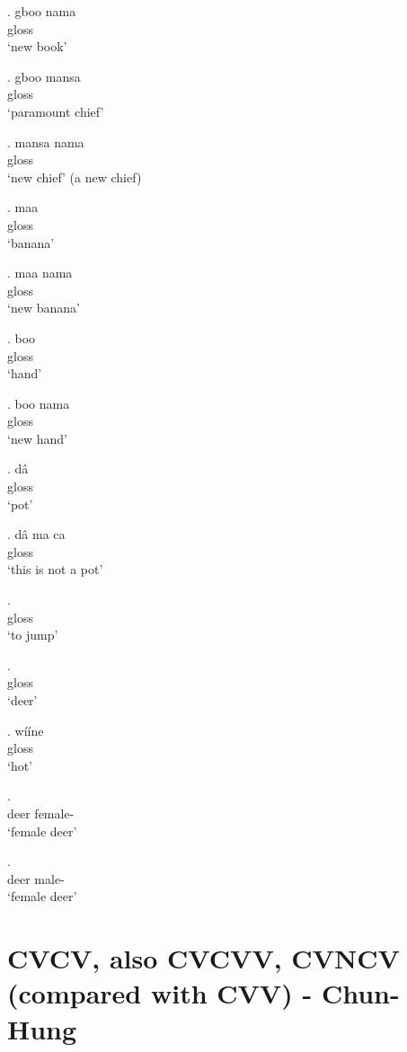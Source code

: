 \documentclass{assets/fieldnotes}
\begin{document}
\exg. gboo nama \\
gloss \\
`new book'

\exg. gboo mansa \\ %
gloss \\
`paramount chief'

\exg. mansa nama \\ %
gloss \\
`new chief' (a new chief)

\exg. maa \\
gloss \\
`banana'

\exg. maa nama \\
gloss\\
`new banana' %

\exg. boo \\
gloss \\
`hand'

\exg. boo nama \\
gloss \\
`new hand'

\exg. dâ \\
gloss \\
`pot'

\exg. dâ ma ca\\
gloss \\
`this is not a pot'

\exg.  \\
gloss \\ 
`to jump' %

\exg.  \\
gloss \\ 
`deer' %

\exg. wííne \\
gloss \\
`hot'

\exg.  \\
deer female- \\
`female deer' %

\exg.  \\
deer male- \\
`female deer' %


\section{CVCV, also CVCVV, CVNCV (compared with CVV) - Chun-Hung} %
\end{document}
